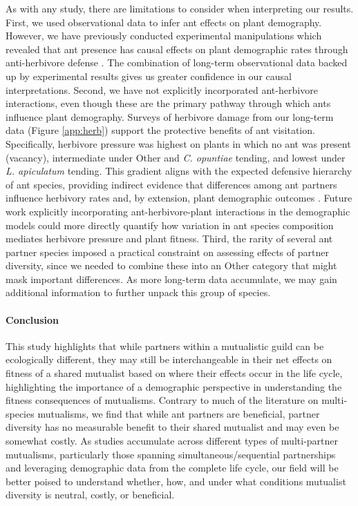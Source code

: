 \documentclass[11pt]{article}
\begin{document}
As with any study, there are limitations to consider when interpreting our results.  
First, we used observational data to infer ant effects on plant demography. 
However, we have previously conducted experimental manipulations which revealed that ant presence has causal effects on plant demographic rates through anti-herbivore defense \citep{Miller2007,Ohm2014}. 
The combination of long-term observational data backed up by experimental results gives us greater confidence in our causal interpretations.  
Second, we have not explicitly incorporated ant-herbivore interactions, even though these are the primary pathway through which ants influence plant demography. 
Surveys of herbivore damage from our long-term data (Figure \ref{app:herb}) support the protective benefits of ant visitation. 
Specifically, herbivore pressure was highest on plants in which no ant was present (vacancy), intermediate under Other and \textit{C. opuntiae} tending, and lowest under \textit{L. apiculatum} tending. 
This gradient aligns with the expected defensive hierarchy of ant species, providing indirect evidence that differences among ant partners influence herbivory rates and, by extension, plant demographic outcomes \citep{Miller2007,Ohm2014}. 
Future work explicitly incorporating ant-herbivore-plant interactions in the demographic models could more directly quantify how variation in ant species composition mediates herbivore pressure and plant fitness. 
Third, the rarity of several ant partner species imposed a practical constraint on assessing effects of partner diversity, since we needed to combine these into an Other category that might mask important differences. 
As more long-term data accumulate, we may gain additional information to further unpack this group of species.

\paragraph{Conclusion}
This study highlights that while partners within a mutualistic guild can be ecologically different, they may still be interchangeable in their net effects on fitness of a shared mutualist based on where their effects occur in the life cycle, highlighting the importance of a demographic perspective in understanding the fitness consequences of mutualisms. 
Contrary to much of the literature on multi-species mutualisms, we find that while ant partners are beneficial, partner diversity has no measurable benefit to their shared mutualist and may even be somewhat costly. 
As studies accumulate across different types of multi-partner mutualisms, particularly those spanning simultaneous/sequential partnerships and leveraging demographic data from the complete life cycle, our field will be better poised to understand whether, how, and under what conditions mutualist diversity is neutral, costly, or beneficial.
\end{document}
